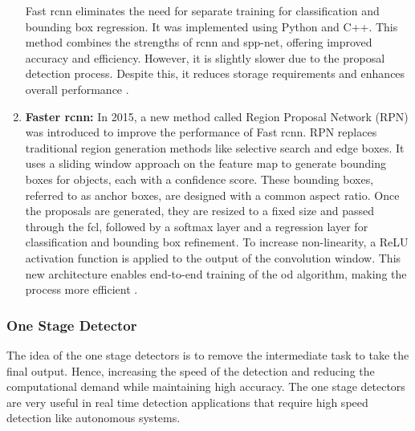 \begin{enumerate}
    Fast \gls{rcnn} eliminates the need for separate training for classification and bounding box regression. It was implemented using Python and C++. This method combines the strengths of \gls{rcnn} and \gls{spp-net}, offering improved accuracy and efficiency. However, it is slightly slower due to the proposal detection process. Despite this, it reduces storage requirements and enhances overall performance \cite{oD_Review}.


    \item \textbf{Faster \gls{rcnn}:} In 2015, a new method called Region Proposal Network (RPN) was introduced to improve the performance of Fast \gls{rcnn}. RPN replaces traditional region generation methods like selective search and edge boxes. It uses a sliding window approach on the feature map to generate bounding boxes for objects, each with a confidence score. These bounding boxes, referred to as anchor boxes, are designed with a common aspect ratio. Once the proposals are generated, they are resized to a fixed size and passed through the \gls{fcl}, followed by a softmax layer and a regression layer for classification and bounding box refinement. To increase non-linearity, a ReLU activation function is applied to the output of the convolution window. This new architecture enables end-to-end training of the \gls{od} algorithm, making the process more efficient \cite{oD_Review}.
\end{enumerate}

\subsubsection{One Stage Detector}
The idea of the one stage detectors is to remove the intermediate task to take the final output. Hence, increasing the speed of the detection and reducing the computational demand while maintaining high accuracy. The one stage detectors are very useful in real time detection applications that require high speed detection like autonomous systems.

